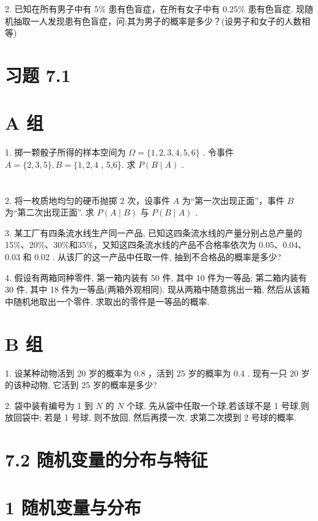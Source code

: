 \documentclass[10pt]{article}
\begin{document}
2. 已知在所有男子中有 5\% 患有色盲症，在所有女子中有 0.25\% 患有色盲症. 现随机抽取一人发现患有色盲症，问:其为男子的概率是多少？(设男子和女子的人数相等)

\section*{习题 7.1}

\section*{A 组}

1. 掷一颗骰子所得的样本空间为 \(\Omega  = \{ 1,2,3,4,5,6\}\) . 令事件 \(A = \{ 2,3,5\} ,B = \{ 1,2,4\) , 5,6\}. 求 \(P\left( {B \mid  A}\right)\) .

\section*{}

2. 将一枚质地均匀的硬币抛掷 2 次，设事件 \(A\) 为“第一次出现正面”，事件 \(B\) 为“第二次出现正面”. 求 \(P\left( {A \mid  B}\right)\) 与 \(P\left( {B \mid  A}\right)\) .

3. 某工厂有四条流水线生产同一产品, 已知这四条流水线的产量分别占总产量的 15\%、20\%、30\%和35\%，又知这四条流水线的产品不合格率依次为 0.05、0.04、0.03 和 0.02 . 从该厂的这一产品中任取一件, 抽到不合格品的概率是多少?

4. 假设有两箱同种零件, 第一箱内装有 50 件, 其中 10 件为一等品; 第二箱内装有 30 件, 其中 18 件为一等品(两箱外观相同). 现从两箱中随意挑出一箱, 然后从该箱中随机地取出一个零件. 求取出的零件是一等品的概率.

\section*{B 组}

1. 设某种动物活到 20 岁的概率为 0.8 ，活到 25 岁的概率为 0.4 . 现有一只 20 岁的该种动物, 它活到 25 岁的概率是多少?

2. 袋中装有编号为 1 到 \(N\) 的 \(N\) 个球. 先从袋中任取一个球,若该球不是 1 号球,则放回袋中; 若是 1 号球, 则不放回, 然后再摸一次. 求第二次摸到 2 号球的概率.

\section*{7.2 随机变量的分布与特征}

\section*{1 随机变量与分布}
\end{document}
